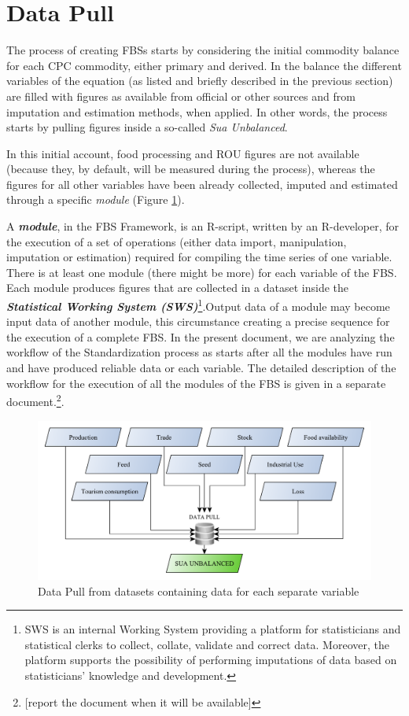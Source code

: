 \documentclass[]{article}
\let\rmarkdownfootnote\footnote%
\def\footnote{\protect\rmarkdownfootnote}
\begin{document}
\section{Data Pull}\label{data-pull}

The process of creating FBSs starts by considering the initial commodity
balance for each CPC commodity, either primary and derived. In the
balance the different variables of the equation (as listed and briefly
described in the previous section) are filled with figures as available
from official or other sources and from imputation and estimation
methods, when applied. In other words, the process starts by pulling
figures inside a so-called \emph{Sua Unbalanced}.

In this initial account, food processing and ROU figures are not
available (because they, by default, will be measured during the
process), whereas the figures for all other variables have been already
collected, imputed and estimated through a specific \emph{module}
(Figure \ref{fig:f1}).

A \textbf{\emph{module}}, in the FBS Framework, is an R-script, written
by an R-developer, for the execution of a set of operations (either data
import, manipulation, imputation or estimation) required for compiling
the time series of one variable. There is at least one module (there
might be more) for each variable of the FBS. Each module produces
figures that are collected in a dataset inside the
\textbf{\emph{Statistical Working System (SWS)}}\footnote{SWS is an
  internal Working System providing a platform for statisticians and
  statistical clerks to collect, collate, validate and correct data.
  Moreover, the platform supports the possibility of performing
  imputations of data based on statisticians' knowledge and development.}.Output
data of a module may become input data of another module, this
circumstance creating a precise sequence for the execution of a complete
FBS. In the present document, we are analyzing the workflow of the
Standardization process as starts after all the modules have run and
have produced reliable data or each variable. The detailed description
of the workflow for the execution of all the modules of the FBS is given
in a separate document.\footnote{{[}report the document when it will be
  available{]}}.

\begin{figure}[htbp]
\centering
\includegraphics{images/StandBal/01_pulldata.pdf}
\caption{\label{fig:f1}Data Pull from datasets containing data for each
separate variable}
\end{figure}
\end{document}
